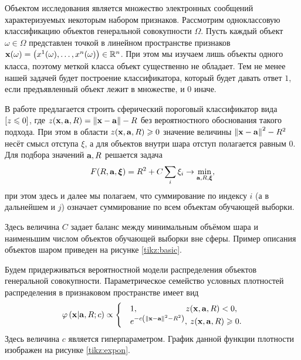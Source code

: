 Объектом исследования является множество электронных сообщений характеризуемых некоторым набором признаков.
Рассмотрим одноклассовую классификацию объектов генеральной совокупности $\Omega$.
Пусть каждый объект $\omega \in{\Omega}$  представлен точкой в линейном пространстве признаков
$\boldsymbol{\mathbf{x}}(\omega)=\left(x^1(\omega),\ldots, x^n(\omega)\right) \in {\mathbb R^n}$. При этом мы изучаем лишь объекты одного класса, поэтому меткой класса объект существенно не обладает.
Тем не менее нашей задачей будет построение классификатора, который будет давать ответ $1$, если предъявленный объект лежит в множестве, и $0$ иначе.

В работе \cite{Tax2001}  предлагается строить сферический пороговый классификатор вида
$\left[z \leqslant 0\right] $, где $z(\boldsymbol{\mathbf{x}},\boldsymbol{\mathbf{a}},R)=\left\|{\boldsymbol{\mathbf{x}}-\boldsymbol{\mathbf{a}}}\right\|-R$ без вероятностного обоснования такого подхода. При этом в области $z(\boldsymbol{\mathbf{x}}, \boldsymbol{\mathbf{a}}, R) \geqslant 0$ значение величины $\left\|{\boldsymbol{\mathbf{x}}-\boldsymbol{\mathbf{a}}}\right\|^2-R^2$ несёт смысл отступа $\xi$, а для объектов внутри шара отступ полагается равным 0. Для подбора значений $\boldsymbol{\mathbf{a}}, R$ решается задача
\begin{equation}
	\label{min:noprob}
	F(R,\boldsymbol{\mathbf{a}}, \boldsymbol{\mathbf{\xi}}) = R^2 + C\sum_i\xi_i \to \min_{\boldsymbol{\mathbf{a}}, R, \boldsymbol{\mathbf{\xi}}},
\end{equation}
при этом здесь и далее мы полагаем, что суммирование по индексу $i$ (а в дальнейшем и $j$) означает суммирование по всем объектам обучающей выборки.

Здесь величина $C$ задает баланс между минимальным объёмом шара и наименьшим числом объектов обучающей выборки вне сферы. Пример описания объектов шаром приведен на рисунке \ref{tikz:basic}.


Будем придерживаться вероятностной модели распределения объектов генеральной совокупности.
Параметрическое семейство условных плотностей распределения в признаковом пространстве имеет вид
\begin{equation}
	\label{PhiXARC}
	\varphi \left( {\boldsymbol{\mathbf{x}} | \boldsymbol{\mathbf{a}},R;c} \right) \propto
		\begin{cases}
			&1, 		\qquad\qquad\qquad  	\! 	z(\boldsymbol{\mathbf{x}},\boldsymbol{\mathbf{a}},R) < 0, \\
			&e^{-c \left(\left\|{\boldsymbol{\mathbf{x}}-\boldsymbol{\mathbf{a}}}\right\|^2-R^2\right)}, 	\:	z(\boldsymbol{\mathbf{x}},\boldsymbol{\mathbf{a}},R) \geqslant 0.
		\end{cases}
\end{equation}
Здесь величина $c$ является гиперпараметром. График данной функции плотности изображен на рисунке \ref{tikz:expon}.


